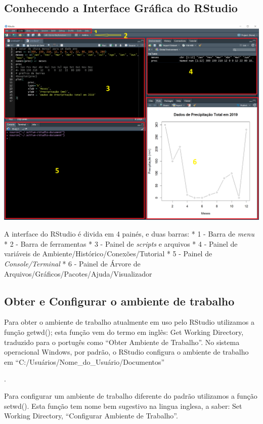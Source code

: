 \documentclass[
]{article}
\begin{document}
\hypertarget{conhecendo-a-interface-gruxe1fica-do-rstudio}{%
\subsection{Conhecendo a Interface Gráfica do
RStudio}\label{conhecendo-a-interface-gruxe1fica-do-rstudio}}

\includegraphics{./output/RStudio.PNG}

A interface do RStudio é divida em 4 painés, e duas barras: * 1 - Barra
de \emph{menu} * 2 - Barra de ferramentas * 3 - Painel de \emph{scripts}
e arquivos * 4 - Painel de variáveis de
Ambiente/Histórico/Conexões/Tutorial * 5 - Painel de
\emph{Console/Terminal} * 6 - Painel de Árvore de
Arquivos/Gráficos/Pacotes/Ajuda/Visualizador

\hypertarget{obter-e-configurar-o-ambiente-de-trabalho}{%
\subsection{Obter e Configurar o ambiente de
trabalho}\label{obter-e-configurar-o-ambiente-de-trabalho}}

Para obter o ambiente de trabalho atualmente em uso pelo RStudio
utilizamos a função getwd(); esta função vem do termo em inglês: Get
Working Directory, traduzido para o portugês como ``Obter Ambiente de
Trabalho''. No sistema operacional Windows, por padrão, o RStudio
configura o ambiente de trabalho em
``C:/Usuários/Nome\_do\_Usuário/Documentos''

.

Para configurar um ambiente de trabalho diferente do padrão utilizamos a
função setwd(). Esta função tem nome bem sugestivo na lingua inglesa, a
saber: Set Working Directory, ``Configurar Ambiente de Trabalho''.
\end{document}
